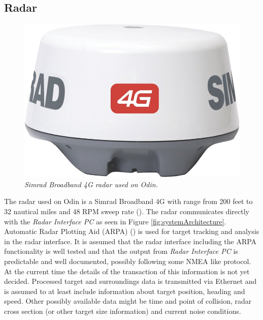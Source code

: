 \subsection{Radar}
\begin{figure}
	\vspace{-30pt}
	\begin{center}
		\includegraphics[width= 0.9\linewidth]{fig/navico4G}
		\vspace{-10pt}
		\caption{\it{Simrad Broadband 4G radar used on Odin.}}
		\label{fig:navico4G}
	\end{center}	
\end{figure}
The radar used on Odin is a Simrad Broadband 4G with range from 200 feet to 32 nautical miles and 48 RPM sweep  rate (\cite{simradBrochure}). The radar communicates directly with the \textit{Radar Interface PC} as seen in Figure \ref{fig:systemArchitecture}. Automatic Radar Plotting Aid (ARPA) (\cite{ARPAmanual}) is used for target tracking and analysis in the radar interface. It is assumed that the radar interface including the ARPA functionality is well tested and that the output from \textit{Radar Interface PC} is predictable and well documented, possibly following some NMEA like protocol. At the current time the details of the transaction of this information is not yet decided. Processed target and surroundings data is transmitted via Ethernet and is assumed to at least include information about target position, heading and speed. Other possibly available data might be time and point of collision, radar cross section (or other target size information) and current noise conditions.\\


\newpage
